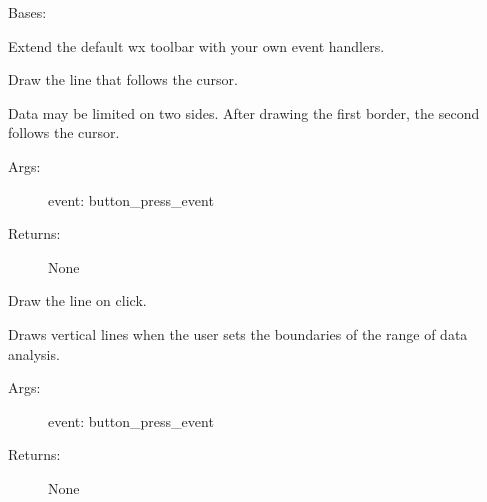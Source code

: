 \documentclass[letterpaper,10pt,english]{sphinxmanual}
\begin{document}
\begin{fulllineitems}
\label{\detokenize{GUI:GUI.MyNavigationToolbar}}
Bases: 

Extend the default wx toolbar with your own event handlers.

\begin{fulllineitems}
\label{\detokenize{GUI:GUI.MyNavigationToolbar.on_curser}}
Draw the line that follows the cursor.

Data may be limited on two sides. After drawing the first border, the second follows the cursor.
\begin{description}
\item[{Args:}] \leavevmode
event: button\_press\_event

\item[{Returns:}] \leavevmode
None

\end{description}

\end{fulllineitems}


\begin{fulllineitems}
\label{\detokenize{GUI:GUI.MyNavigationToolbar.on_press}}
Draw the line on click.

Draws vertical lines when the user sets the boundaries of the range of data analysis.
\begin{description}
\item[{Args:}] \leavevmode
event: button\_press\_event

\item[{Returns:}] \leavevmode
None

\end{description}

\end{fulllineitems}


\end{fulllineitems}
\end{document}
